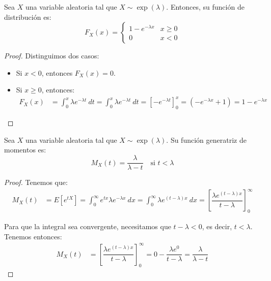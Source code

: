 \begin{prop}
    Sea $X$ una variable aleatoria tal que $X\sim \exp(\lambda)$. Entonces, su función de distribución es:
    \begin{equation*}
        F_X(x) = \begin{cases}
            1-e^{-\lambda x} & x\geq 0\\
            0 & x<0
        \end{cases}
    \end{equation*}
\end{prop}
\begin{proof}
    Distinguimos dos casos:
    \begin{itemize}
        \item Si $x<0$, entonces $F_X(x) = 0$.
        \item Si $x\geq 0$, entonces:
        \begin{align*}
            F_X(x) &= \int_{0}^{x} \lambda e^{-\lambda t}~dt
            = \int_{0}^{x} \lambda e^{-\lambda t}~dt
            = \left[ -e^{-\lambda t} \right]_{0}^{x}
            = \left( -e^{-\lambda x} + 1 \right) = 1-e^{-\lambda x}
        \end{align*}
    \end{itemize}
\end{proof}


\begin{prop}
    Sea $X$ una variable aleatoria tal que $X\sim \exp(\lambda)$. Su función generatriz de momentos es:
    \begin{equation*}
        M_X(t) = \dfrac{\lambda}{\lambda-t} \quad \text{si } t<\lambda
    \end{equation*}
\end{prop}
\begin{proof}
    Tenemos que:
    \begin{align*}
        M_X(t) &= E\left[e^{tX}\right] = \int_{0}^{\infty} e^{tx} \lambda e^{-\lambda x}~dx
        = \int_{0}^{\infty} \lambda e^{(t-\lambda)x}~dx
        = \left[ \dfrac{\lambda e^{(t-\lambda)x}}{t-\lambda} \right]_{0}^{\infty}
    \end{align*}

    Para que la integral sea convergente, necesitamos que $t-\lambda<0$, es decir, $t<\lambda$. Tenemos entonces:
    \begin{align*}
        M_X(t) &= \left[ \dfrac{\lambda e^{(t-\lambda)x}}{t-\lambda} \right]_{0}^{\infty}
        = 0 - \dfrac{\lambda e^{0}}{t-\lambda} = \dfrac{\lambda}{\lambda-t}
    \end{align*}
\end{proof}

